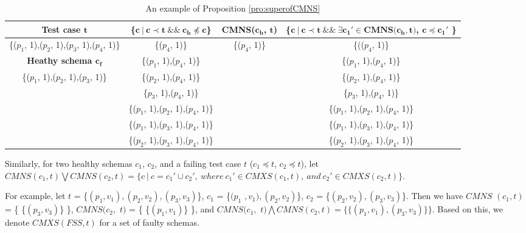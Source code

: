 \documentclass{sig-alternate-05-2015}
\begin{document}
{{%
\begin{table}[ht]
  \centering
  \setlength{\tabcolsep}{3pt}
  \caption{An example of Proposition \ref{pro:superofCMNS}}
    \begin{tabular}{|c|c|c|c|}
    \hline
  \textbf{  Test case $\textbf{t}$} & \textbf{ \{$\textbf{c}\ |\ \textbf{c} \prec \textbf{t}\ \&\&\ \textbf{c}_{\textbf{h}} \npreceq \textbf{c}$\} }& \textbf{ CMNS($\textbf{c}_{\textbf{h}}$, $\textbf{t}$)} & \textbf{\{$ \textbf{c}\ |\ \textbf{c} \prec \textbf{t} \ \&\& \ \exists \textbf{c}_{\textbf{1}}' \in \textbf{CMNS}\textbf{(}\textbf{c}_{\textbf{h}}, \textbf{t}\textbf{)}$, $\textbf{c} \preceq \textbf{c}_{\textbf{1}}'$ \}}\\\hline
    \{($p_{1}$, 1),($p_{2}$, 1),($p_{3}$, 1),($p_{4}$, 1)\}  & \{($p_{4}$, 1)\} & \{($p_{4}$, 1)\} & \{(($p_{4}$, 1)\}\\ \cline{1-1}
      \textbf{Heathy schema $\textbf{c}_{\textbf{f}}$}  & \{($p_{1}$, 1),($p_{4}$, 1)\} &  & \{($p_{1}$, 1),($p_{4}$, 1)\} \\\cline{1-1}
     \{($p_{1}$, 1),($p_{2}$, 1),($p_{3}$, 1)\}         &\{($p_{2}$, 1),($p_{4}$, 1)\}  &  & \{($p_{2}$, 1),($p_{4}$, 1)\}  \\ 
                         &\{$p_{3}$, 1),($p_{4}$, 1)\}   &  & \{$p_{3}$, 1),($p_{4}$, 1)\}  \\ 
                         &\{($p_{1}$, 1),($p_{2}$, 1),($p_{4}$, 1)\}   &  & \{($p_{1}$, 1),($p_{2}$, 1),($p_{4}$, 1)\}  \\ 
                         &\{($p_{1}$, 1),($p_{3}$, 1),($p_{4}$, 1)\}  &  & \{($p_{1}$, 1),($p_{3}$, 1),($p_{4}$, 1)\}  \\
                         &\{($p_{2}$, 1),($p_{3}$, 1),($p_{4}$, 1)\}  &  & \{($p_{2}$, 1),($p_{3}$, 1),($p_{4}$, 1)\}  \\ \hline
    \end{tabular}%
  \label{examleOfCMNSPro}%
\end{table}%


Similarly, for two healthy schemas $c_{1}$, $c_{2}$, and a failing test case $t$ ($c_{1} \preceq t$, $c_{2} \preceq t$), let $CMNS(c_{1}, t) \bigvee CMNS(c_{2}, t)  = \{ c\ |\ c = c_{1}' \cup c_{2}',\ where\ c_{1}' \in CMXS(c_{1}, t),\ and\ c_{2}' \in CMXS(c_{2}, t) \}$.

For example, let $t$ = \{$(p_{1},v_{1}), (p_{2}, v_{2}), (p_{3}, v_{3})$\}, $c_{1}$ = \{$(p_{1}$ $, v_{1}), (p_{2}, v_{2})$\}, $c_{2}$ = \{$(p_{2}, v_{2}), (p_{3}, v_{3})$\}. Then we have $CMNS$ $(c_{1}, t)$ = \{ \{$(p_{3}, v_{3})$\} \}, $CMNS(c_{2},$ $ t)$ = \{ \{$(p_{1}, v_{1})$\} \}, and  $CMNS(c_{1},$ $ t) \bigwedge CMNS(c_{2}, t) = \{ \{(p_{1}, v_{1}), (p_{3}, v_{3})\} \} $. Based on this, we denote $CMXS(FSS,t)$ for a set of faulty schemas.

}}
\end{document}
